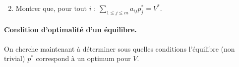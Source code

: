 \begin{enumerate}
  \setcounter{enumi}{1}
  \item Montrer que, pour tout $i$ : $\sum_{1 \leq j \leq m} a_{ij} p^*_j = V^*$.
\end{enumerate}

\paragraph{Condition d'optimalité d'un équilibre.}
On cherche maintenant à déterminer sous quelles conditions l'équilibre (non trivial) $p^*$ correspond à un optimum pour $V$.


